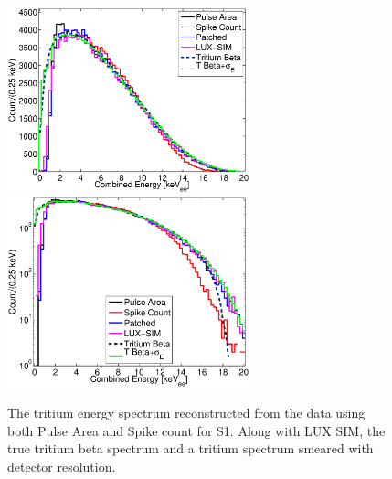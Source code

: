 \newpage

 \begin{figure}[h!]\centering
\includegraphics[width=70mm]{Recombination_LY_QY/Figures/E_Spec/E_spec_compare_SIM.eps}
\includegraphics[width=70mm]{Recombination_LY_QY/Figures/E_Spec/E_spec_compare_SIM_log_.eps}
\caption{The tritium energy spectrum reconstructed from the data using both Pulse Area and Spike count for S1. Along with LUX SIM, the true tritium beta spectrum and a tritium spectrum smeared with detector resolution. }
\label{fig:E_spec}
\end{figure}


